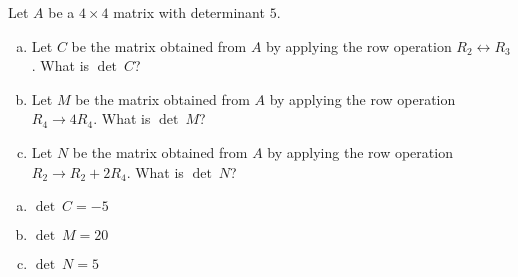 
\begin{exerciseStatement}


Let \(A\) be a \(4 \times 4\) matrix with determinant \( 5 \).


\begin{enumerate}[(a)]
\item Let \(C\) be the matrix obtained from \(A\) by applying the row operation \( R_2 \leftrightarrow R_3 \). What is \(\operatorname{det}\ C\)?
\item Let \(M\) be the matrix obtained from \(A\) by applying the row operation \( R_4 \to 4R_4 \). What is \(\operatorname{det}\ M\)?
\item Let \(N\) be the matrix obtained from \(A\) by applying the row operation \( R_2 \to R_2 + 2R_4 \). What is \(\operatorname{det}\ N\)?
\end{enumerate}
    
\end{exerciseStatement}
    
\begin{exerciseAnswer} 

\begin{enumerate}[(a)]
\item \(\operatorname{det}\ C= -5 \)
\item \(\operatorname{det}\ M= 20 \)
\item \(\operatorname{det}\ N= 5 \)
\end{enumerate}
    
\end{exerciseAnswer}
    

